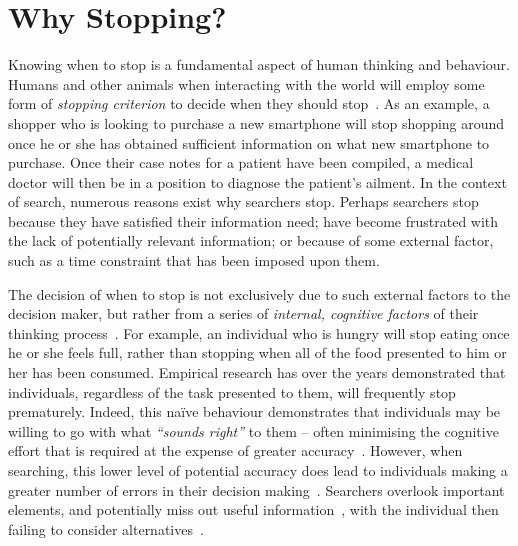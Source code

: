 \section{Why Stopping?}\label{sec:stopping_background:why}
Knowing when to stop is a fundamental aspect of human thinking and behaviour. Humans and other animals when interacting with the world will employ some form of \emph{stopping criterion} to decide when they should stop~\citep{nickles1995judgment}. As an example, a shopper who is looking to purchase a new smartphone will stop shopping around once he or she has obtained sufficient information on what new smartphone to purchase. Once their case notes for a patient have been compiled, a medical doctor will then be in a position to diagnose the patient's ailment. In the context of search, numerous reasons exist why searchers stop. Perhaps searchers stop because they have satisfied their information need; have become frustrated with the lack of potentially relevant information; or because of some external factor, such as a time constraint that has been imposed upon them.

The decision of when to stop is not exclusively due to such external factors to the decision maker, but rather from a series of \emph{internal, cognitive factors} of their thinking process~\citep{nickles1995judgment}. For example, an individual who is hungry will stop eating once he or she feels full, rather than stopping when all of the food presented to him or her has been consumed. Empirical research has over the years demonstrated that individuals, regardless of the task presented to them, will frequently stop prematurely. Indeed, this na\"{i}ve behaviour demonstrates that individuals may be willing to go with what \emph{``sounds right''} to them -- often minimising the cognitive effort that is required at the expense of greater accuracy~\citep{perkins1983difficulties}. However, when searching, this lower level of potential accuracy does lead to individuals making a greater number of errors in their decision making~\citep{baron1988heuristics}. Searchers overlook important elements, and potentially miss out useful information~\citep{fischhoff1977cost_benefit, fischhoff1978fault, shafir1992thinking}, with the individual then failing to consider alternatives~\citep{farquhar1993decision_structuring}.

